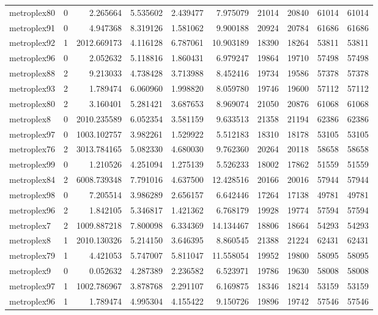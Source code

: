 \begin{longtable}{|l|r|r|r|r|r|r|r|r|r|}
metroplex80 & 0 & 2.265664 & 5.535602 & 2.439477 & 7.975079 & 21014 & 20840 & 61014 & 61014 \\
metroplex91 & 0 & 4.947368 & 8.319126 & 1.581062 & 9.900188 & 20924 & 20784 & 61686 & 61686 \\
metroplex92 & 1 & 2012.669173 & 4.116128 & 6.787061 & 10.903189 & 18390 & 18264 & 53811 & 53811 \\
metroplex96 & 0 & 2.052632 & 5.118816 & 1.860431 & 6.979247 & 19864 & 19710 & 57498 & 57498 \\
metroplex88 & 2 & 9.213033 & 4.738428 & 3.713988 & 8.452416 & 19734 & 19586 & 57378 & 57378 \\
metroplex93 & 2 & 1.789474 & 6.060960 & 1.998820 & 8.059780 & 19746 & 19600 & 57112 & 57112 \\
metroplex80 & 2 & 3.160401 & 5.281421 & 3.687653 & 8.969074 & 21050 & 20876 & 61068 & 61068 \\
metroplex8 & 0 & 2010.235589 & 6.052354 & 3.581159 & 9.633513 & 21358 & 21194 & 62386 & 62386 \\
metroplex97 & 0 & 1003.102757 & 3.982261 & 1.529922 & 5.512183 & 18310 & 18178 & 53105 & 53105 \\
metroplex76 & 2 & 3013.784165 & 5.082330 & 4.680030 & 9.762360 & 20264 & 20118 & 58658 & 58658 \\
metroplex99 & 0 & 1.210526 & 4.251094 & 1.275139 & 5.526233 & 18002 & 17862 & 51559 & 51559 \\
metroplex84 & 2 & 6008.739348 & 7.791016 & 4.637500 & 12.428516 & 20166 & 20016 & 57944 & 57944 \\
metroplex98 & 0 & 7.205514 & 3.986289 & 2.656157 & 6.642446 & 17264 & 17138 & 49781 & 49781 \\
metroplex96 & 2 & 1.842105 & 5.346817 & 1.421362 & 6.768179 & 19928 & 19774 & 57594 & 57594 \\
metroplex7 & 2 & 1009.887218 & 7.800098 & 6.334369 & 14.134467 & 18806 & 18664 & 54293 & 54293 \\
metroplex8 & 1 & 2010.130326 & 5.214150 & 3.646395 & 8.860545 & 21388 & 21224 & 62431 & 62431 \\
metroplex79 & 1 & 4.421053 & 5.747007 & 5.811047 & 11.558054 & 19952 & 19800 & 58095 & 58095 \\
metroplex9 & 0 & 0.052632 & 4.287389 & 2.236582 & 6.523971 & 19786 & 19630 & 58008 & 58008 \\
metroplex97 & 1 & 1002.786967 & 3.878768 & 2.291107 & 6.169875 & 18346 & 18214 & 53159 & 53159 \\
metroplex96 & 1 & 1.789474 & 4.995304 & 4.155422 & 9.150726 & 19896 & 19742 & 57546 & 57546 \\

\end{longtable}
